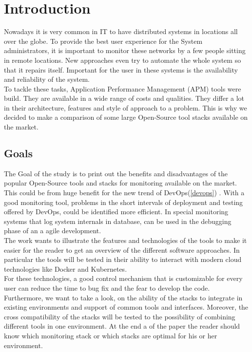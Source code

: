 
\chapter{Introduction}
Nowadays it is very common in IT to have distributed systems in locations all over the globe\cite{1687567}. To provide the best user experience for the System administrators, it is important to monitor these networks by a few people sitting in remote locations. New approaches even try to automate the whole system so that it repairs itself. Important for the user in these systems is the availability and reliability of the system. 
\\
To tackle these tasks, Application Performance Management (APM) tools were build. They are available in a wide range of costs and qualities. They differ a lot in their architecture, features and style of approach to a problem. This is why we decided to make a comparison of some large Open-Source tool stacks available on the market. 
\section{Goals}
The Goal of the study is to print out the benefits and disadvantages of the popular Open-Source tools and stacks for monitoring available on the market. This could be from huge benefit for the new trend of DevOps(\cref{devops}) \cite{Bass:2015:DSA:2810087} . With a good monitoring tool, problems in the short intervals of deployment and testing offered by DevOps, could be identified more efficient. In special monitoring systems that log system internals in database, can be used in the debugging phase of an a agile development.  
\\ The work wants to illustrate the features and technologies of the tools to make it easier for the reader to get an overview of the different software approaches. In particular the tools will be tested in their ability to interact with modern cloud technologies like Docker and Kubernetes.\\
For these technologies, a good control mechanism that is customizable for every user can reduce the time to bug fix and the fear to develop the code.
 Furthermore, we want to take a look, on the ability of the stacks to integrate in existing environments and support of common tools and interfaces. Moreover, the cross compatibility of the stacks will be tested to the possibility of combining different tools in one environment. At the end a of the paper the reader should know which monitoring stack or which stacks are optimal for his or her environment.  

